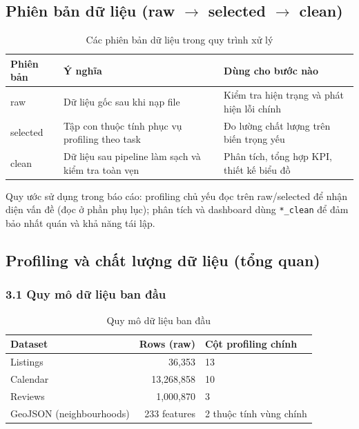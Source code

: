 \subsection{Phiên bản dữ liệu (raw $\rightarrow$ selected $\rightarrow$ clean)}

\begin{table}[htbp]
\centering
\caption{Các phiên bản dữ liệu trong quy trình xử lý}
\begin{tabularx}{\textwidth}{@{} l l X @{}}
\toprule
\textbf{Phiên bản} & \textbf{Ý nghĩa} & \textbf{Dùng cho bước nào} \\
\midrule
raw      & Dữ liệu gốc sau khi nạp file & Kiểm tra hiện trạng và phát hiện lỗi chính \\ \hline
selected & Tập con thuộc tính phục vụ profiling theo task & Đo lường chất lượng trên biến trọng yếu \\ \hline
clean    & Dữ liệu sau pipeline làm sạch và kiểm tra toàn vẹn & Phân tích, tổng hợp KPI, thiết kế biểu đồ \\ \hline
\bottomrule
\end{tabularx}
\end{table}

Quy ước sử dụng trong báo cáo: profiling chủ yếu đọc trên raw/selected để nhận diện vấn đề (đọc ở phần phụ lục); phân tích và dashboard dùng \texttt{*\_clean} để đảm bảo nhất quán và khả năng tái lập.

\subsection{Profiling và chất lượng dữ liệu (tổng quan)}

\subsubsection*{3.1 Quy mô dữ liệu ban đầu}

\begin{table}[htbp]
\centering
\caption{Quy mô dữ liệu ban đầu}
\begin{tabular}{@{} l r l @{}}
\toprule
\textbf{Dataset} & \textbf{Rows (raw)} & \textbf{Cột profiling chính} \\
\midrule
Listings                    & 36,353         & 13 \\ \hline
Calendar                    & 13,268,858     & 10 \\\hline
Reviews                     & 1,000,870      & 3  \\\hline
GeoJSON (neighbourhoods)    & 233 features   & 2 thuộc tính vùng chính \\
\bottomrule
\end{tabular}
\end{table}

